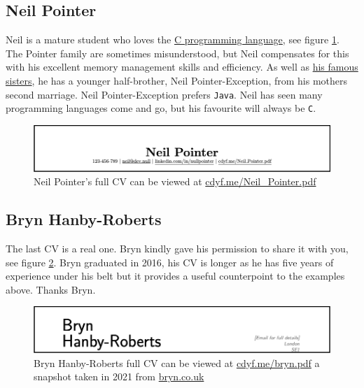 \documentclass[
]{book}
\begin{document}
\hypertarget{neil-pointer}{%
\subsection{Neil Pointer}\label{neil-pointer}}

Neil is a mature student who loves the \href{https://en.wikipedia.org/wiki/C_(programming_language)}{C programming language}, see figure \ref{fig:neilpointer-fig}. The Pointer family are sometimes misunderstood, but Neil compensates for this with his excellent memory management skills and efficiency. As well as \href{https://en.wikipedia.org/wiki/The_Pointer_Sisters}{his famous sisters}, he has a younger half-brother, Neil Pointer-Exception, from his mothers second marriage. Neil Pointer-Exception prefers \texttt{Java}. Neil has seen many programming languages come and go, but his favourite will always be \texttt{C}.

\begin{figure}

{\centering \includegraphics[width=1\linewidth]{images/neil_pointer} 

}

\caption{Neil Pointer's full CV can be viewed at \href{https://www.cdyf.me/Neil_Pointer.pdf}{cdyf.me/Neil\_Pointer.pdf}}\label{fig:neilpointer-fig}
\end{figure}



\hypertarget{bryn}{%
\subsection{Bryn Hanby-Roberts}\label{bryn}}

The last CV is a real one. Bryn kindly gave his permission to share it with you, see figure \ref{fig:bryn-fig}. Bryn graduated in 2016, his CV is longer as he has five years of experience under his belt but it provides a useful counterpoint to the examples above. Thanks Bryn. 🙏

\begin{figure}

{\centering \includegraphics[width=1\linewidth]{images/bryn} 

}

\caption{Bryn Hanby-Roberts full CV can be viewed at \href{https://www.cdyf.me/bryn.pdf}{cdyf.me/bryn.pdf} a snapshot taken in 2021 from \href{http://bryn.co.uk}{bryn.co.uk}}\label{fig:bryn-fig}
\end{figure}
\end{document}
